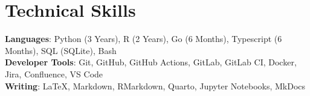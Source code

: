\section{Technical Skills}

\begin{itemize}[leftmargin=0.15in, label={}]
    \small{\item{
                    \textbf{Languages}{: Python (3 Years), R (2 Years), Go (6 Months), Typescript (6 Months), SQL (SQLite), Bash} \\
                    \textbf{Developer Tools}{: Git, GitHub, GitHub Actions, GitLab, GitLab CI, Docker, Jira, Confluence, VS Code} \\
                    \textbf{Writing}{: LaTeX, Markdown, RMarkdown, Quarto, Jupyter Notebooks, MkDocs}
              }}
\end{itemize}